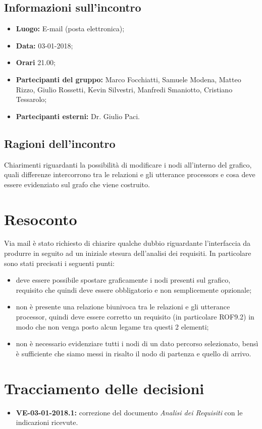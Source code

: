 \documentclass[openany,12pt,a4paper]{article}
\begin{document}
  \subsection{Informazioni sull'incontro} 
   
  \begin{itemize}  
      \item \textbf{Luogo:} E-mail (posta elettronica);
      \item \textbf{Data:} 03-01-2018; 
      \item \textbf{Orari} 21.00;
      \item \textbf{Partecipanti del gruppo:} Marco Focchiatti, Samuele Modena, Matteo Rizzo, Giulio Rossetti, Kevin Silvestri, Manfredi Smaniotto, Cristiano Tessarolo; 
      \item \textbf{Partecipanti esterni:} Dr. Giulio Paci. 
  \end{itemize} 
 
  \subsection{Ragioni dell'incontro} 
  Chiarimenti riguardanti la possibilità di modificare i nodi all'interno del grafico, quali differenze intercorrono tra le relazioni e gli utterance processors e cosa deve essere evidenziato sul grafo che viene costruito. 
 
  \section{Resoconto} 
 
  Via mail è stato richiesto di chiarire qualche dubbio riguardante l'interfaccia da produrre in seguito ad un iniziale stesura dell'analisi dei requisiti. 
  In particolare sono stati precisati i seguenti punti: 

   \begin{itemize} 
    \item deve essere possibile spostare graficamente i nodi presenti sul grafico, requisito che quindi deve essere obbligatorio e non semplicemente opzionale; 
    \item non è presente una relazione biunivoca tra le relazioni e gli utterance processor, quindi deve essere corretto un requisito (in particolare ROF9.2) in modo che non venga posto alcun legame tra questi 2 elementi; 
    \item non è necessario evidenziare tutti i nodi di un dato percorso selezionato, bensì è sufficiente che siamo messi in risalto il nodo di partenza e quello di arrivo. 
  \end{itemize} 
 
  \section{Tracciamento delle decisioni} 
   
  \begin{itemize} 
      \item \textbf{VE-03-01-2018.1:}  
      correzione del documento \textit{Analisi dei Requisiti} con le indicazioni ricevute. 
  \end{itemize} 
   
  
\end{document}
